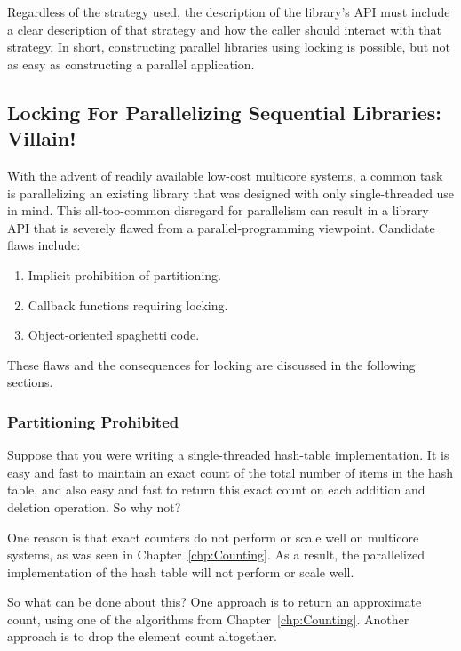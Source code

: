 Regardless of the strategy used, the description of the library's API
must include a clear description of that strategy and how the caller
should interact with that strategy.
In short, constructing parallel libraries using locking is possible,
but not as easy as constructing a parallel application.

\subsection{Locking For Parallelizing Sequential Libraries: Villain!}
\label{sec:locking:Locking For Parallelizing Sequential Libraries: Villain!}

With the advent of readily available low-cost multicore systems,
a common task is parallelizing an existing library that was designed
with only single-threaded use in mind.
This all-too-common disregard for parallelism can result in a library
API that is severely flawed from a parallel-programming viewpoint.
Candidate flaws include:

\begin{enumerate}
\item	Implicit prohibition of partitioning.
\item	Callback functions requiring locking.
\item	Object-oriented spaghetti code.
\end{enumerate}

These flaws and the consequences for locking are discussed in the following
sections.

\subsubsection{Partitioning Prohibited}
\label{sec:locking:Partitioning Prohibited}

Suppose that you were writing a single-threaded hash-table implementation.
It is easy and fast to maintain an exact count of the total number of items
in the hash table, and also easy and fast to return this exact count on each
addition and deletion operation.
So why not?

One reason is that exact counters do not perform or scale well on
multicore systems, as was
seen in Chapter~\ref{chp:Counting}.
As a result, the parallelized implementation of the hash table will not
perform or scale well.

So what can be done about this?
One approach is to return an approximate count, using one of the algorithms
from Chapter~\ref{chp:Counting}.
Another approach is to drop the element count altogether.


